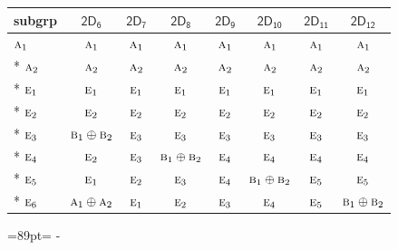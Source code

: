 \documentclass[10pt,a4paper]{article}
\newcommand{\needspace}[1]{\par\penalty-100\begingroup\dimen0=#1\relax\dimen2=\pagegoal
  \advance\dimen2-\pagetotal\ifdim\dimen0>\dimen2\relax\ifdim\dimen2>0pt\vfil\break\fi\fi
  \endgroup}
\numberwithin{equation}{section}
\newcommand{\grp}[1]{\mathsf{#1}}
\newcommand{\irr}[1]{\text{\normalfont\scshape #1}}
\begin{document}
{\small\begin{longtable}{@{}lccccccc@{}}\toprule
subgrp & \href{2D6.pdf}{$\grp{2D_{6}}$} & \href{2D7.pdf}{$\grp{2D_{7}}$} & \href{2D8.pdf}{$\grp{2D_{8}}$} & \href{2D9.pdf}{$\grp{2D_{9}}$} & \href{2D10.pdf}{$\grp{2D_{10}}$} & \href{2D11.pdf}{$\grp{2D_{11}}$} & \href{2D12.pdf}{$\grp{2D_{12}}$}\\\midrule\endhead
\bottomrule\endfoot\endlastfoot
$\irr{a}_{1}$ & $\irr{a}_{1}$ & $\irr{a}_{1}$ & $\irr{a}_{1}$ & $\irr{a}_{1}$ & $\irr{a}_{1}$ & $\irr{a}_{1}$ & $\irr{a}_{1}$\\*
$\irr{a}_{2}$ & $\irr{a}_{2}$ & $\irr{a}_{2}$ & $\irr{a}_{2}$ & $\irr{a}_{2}$ & $\irr{a}_{2}$ & $\irr{a}_{2}$ & $\irr{a}_{2}$\\*
$\irr{e}_{1}$ & $\irr{e}_{1}$ & $\irr{e}_{1}$ & $\irr{e}_{1}$ & $\irr{e}_{1}$ & $\irr{e}_{1}$ & $\irr{e}_{1}$ & $\irr{e}_{1}$\\*
$\irr{e}_{2}$ & $\irr{e}_{2}$ & $\irr{e}_{2}$ & $\irr{e}_{2}$ & $\irr{e}_{2}$ & $\irr{e}_{2}$ & $\irr{e}_{2}$ & $\irr{e}_{2}$\\*
$\irr{e}_{3}$ & $\irr{b}_{1}\oplus \irr{b}_{2}$ & $\irr{e}_{3}$ & $\irr{e}_{3}$ & $\irr{e}_{3}$ & $\irr{e}_{3}$ & $\irr{e}_{3}$ & $\irr{e}_{3}$\\*
$\irr{e}_{4}$ & $\irr{e}_{2}$ & $\irr{e}_{3}$ & $\irr{b}_{1}\oplus \irr{b}_{2}$ & $\irr{e}_{4}$ & $\irr{e}_{4}$ & $\irr{e}_{4}$ & $\irr{e}_{4}$\\*
$\irr{e}_{5}$ & $\irr{e}_{1}$ & $\irr{e}_{2}$ & $\irr{e}_{3}$ & $\irr{e}_{4}$ & $\irr{b}_{1}\oplus \irr{b}_{2}$ & $\irr{e}_{5}$ & $\irr{e}_{5}$\\*
$\irr{e}_{6}$ & $\irr{a}_{1}\oplus \irr{a}_{2}$ & $\irr{e}_{1}$ & $\irr{e}_{2}$ & $\irr{e}_{3}$ & $\irr{e}_{4}$ & $\irr{e}_{5}$ & $\irr{b}_{1}\oplus \irr{b}_{2}$\\
\bottomrule\end{longtable}}

\needspace{89pt}
\end{document}
